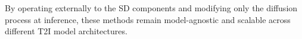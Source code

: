 By operating externally to the SD components and modifying only the diffusion process at inference, these methods remain model-agnostic and scalable across different T2I model architectures.







